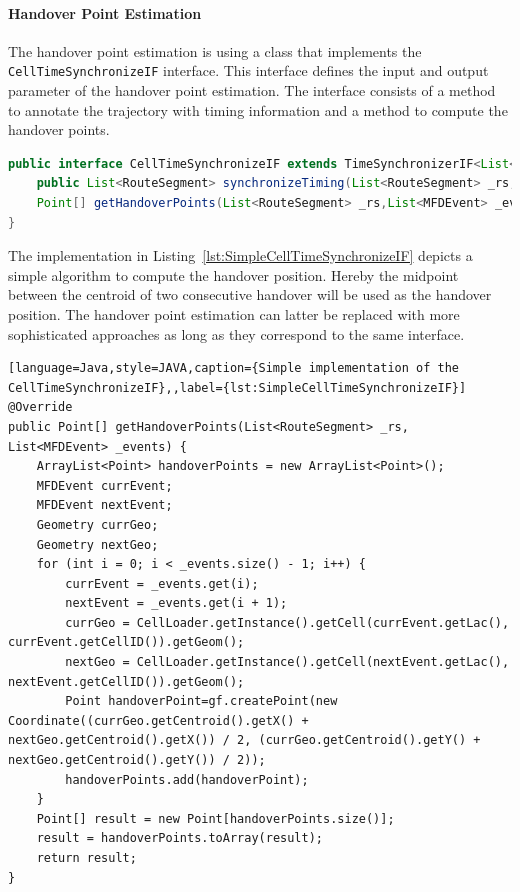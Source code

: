 \documentclass[master,english]{hgbthesis}
\begin{document}
\paragraph{Handover Point Estimation}
The handover point estimation is using a class that implements the \lstinline|CellTimeSynchronizeIF| interface. This interface defines the input and output parameter of the handover point estimation. The interface consists of a method to annotate the trajectory with timing information and a method to compute the handover points. 
\begin{lstlisting}[language=Java,style=JAVA,caption={Interface for handover point estimation CellTimeSynchronizeIF},label={lst:CellTimeSynchronizeIF}]
public interface CellTimeSynchronizeIF extends TimeSynchronizerIF<List<MFDEvent>> {
    public List<RouteSegment> synchronizeTiming(List<RouteSegment> _rs,List<MFDEvent> _events);
    Point[] getHandoverPoints(List<RouteSegment> _rs,List<MFDEvent> _events);
}
\end{lstlisting}
The implementation in Listing~\ref{lst:SimpleCellTimeSynchronizeIF} depicts a simple algorithm to compute the handover position. Hereby the midpoint between the centroid of two consecutive handover will be used as the handover position. The handover point estimation can latter be replaced with more sophisticated approaches as long as they correspond to the same interface.
\begin{lstlisting}[language=Java,style=JAVA,caption={Simple implementation of the CellTimeSynchronizeIF},,label={lst:SimpleCellTimeSynchronizeIF}]
@Override
public Point[] getHandoverPoints(List<RouteSegment> _rs, List<MFDEvent> _events) {
	ArrayList<Point> handoverPoints = new ArrayList<Point>();
	MFDEvent currEvent;
	MFDEvent nextEvent;
	Geometry currGeo;
	Geometry nextGeo;
	for (int i = 0; i < _events.size() - 1; i++) {
		currEvent = _events.get(i);
		nextEvent = _events.get(i + 1);
		currGeo = CellLoader.getInstance().getCell(currEvent.getLac(), currEvent.getCellID()).getGeom();
		nextGeo = CellLoader.getInstance().getCell(nextEvent.getLac(), nextEvent.getCellID()).getGeom();
		Point handoverPoint=gf.createPoint(new Coordinate((currGeo.getCentroid().getX() + nextGeo.getCentroid().getX()) / 2, (currGeo.getCentroid().getY() + nextGeo.getCentroid().getY()) / 2));
		handoverPoints.add(handoverPoint);
	}
	Point[] result = new Point[handoverPoints.size()];
	result = handoverPoints.toArray(result);
	return result;
}
\end{lstlisting}
\end{document}
